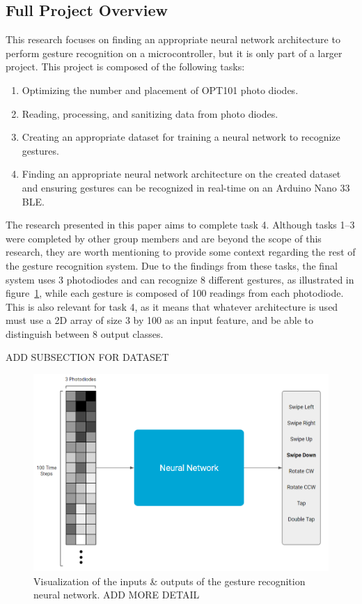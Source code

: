 \subsection{Full Project Overview}\label{subsec:project-pipeline}
This research focuses on finding an appropriate neural network architecture to perform gesture recognition on a microcontroller, but it is only part of a larger project.
This project is composed of the following tasks:
\begin{enumerate}
    \item Optimizing the number and placement of OPT101 photo diodes.
    \item Reading, processing, and sanitizing data from photo diodes.
    \item Creating an appropriate dataset for training a neural network to recognize gestures.
    \item Finding an appropriate neural network architecture on the created dataset and ensuring gestures can be recognized in real-time on an Arduino Nano 33 BLE\@.
\end{enumerate}

The research presented in this paper aims to complete task 4.
Although tasks 1--3 were completed by other group members and are beyond the scope of this research, they are worth mentioning to provide some context regarding the rest of the gesture recognition system.
Due to the findings from these tasks, the final system uses 3 photodiodes and can recognize 8 different gestures, as illustrated in figure~\ref{fig:system}\@, while each gesture is composed of 100 readings from each photodiode.
This is also relevant for task 4, as it means that whatever architecture is used must use a 2D array of size 3 by 100 as an input feature, and be able to distinguish between 8 output classes.

ADD SUBSECTION FOR DATASET

\begin{figure}[h]
    \centering
    \captionsetup{justification=centering}
    \includegraphics[width=\linewidth]{figures/system}
    \caption{Visualization of the inputs \& outputs of the gesture recognition neural network. ADD MORE DETAIL}
    \label{fig:system}
\end{figure}
